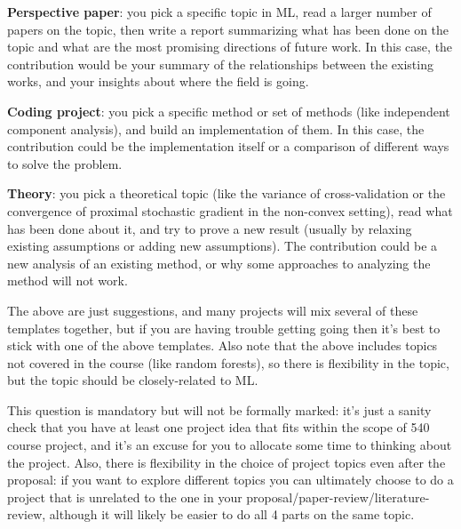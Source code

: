 \documentclass{article}
\def\blu#1{{\color{blu}#1}}
\begin{document}
{\item \textbf{Perspective paper}: you pick a specific topic in ML, read a larger number of papers on the topic, then write a report summarizing what has been done on the topic and what are the most promising directions of future work. In this case, the contribution would be your summary of the relationships between the existing works, and your insights about where the field is going.
\item \textbf{Coding project}: you pick a specific method or set of methods (like independent component analysis), and build an implementation of them. In this case, the contribution could be the implementation itself or a comparison of different ways to solve the problem.
\item \textbf{Theory}: you pick a theoretical topic (like the variance of cross-validation or the convergence of proximal stochastic gradient in the non-convex setting), read what has been done about it, and try to prove a new result (usually by relaxing existing assumptions or adding new assumptions). The contribution could be a new analysis of an existing method, or why some approaches to analyzing the method will not work.
}
The above are just suggestions, and many projects will mix several of these templates together, but if you are having trouble getting going then it's best to stick with one of the above templates. Also note that the above includes topics not covered in the course (like random forests), so there is flexibility in the topic, but the topic should be closely-related to ML.

\blu{This question is mandatory but will not be formally marked: it's just a sanity check that you have at least one project idea that fits within the scope of 540 course project, and it's an excuse for you to allocate some time to thinking about the project.} Also, there is flexibility in the choice of project topics even after the proposal: if you want to explore different topics you can ultimately choose to do a project that is unrelated to the one in your proposal/paper-review/literature-review, although it will likely be easier to do all 4 parts on the same topic.
 
\end{document}
